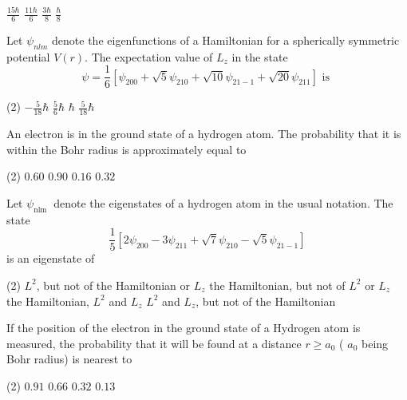 \begin{enumerate}
\begin{tasks}
	\task[\textbf{A.}] $\frac{15 \hbar}{6}$
	\task[\textbf{B.}]$\frac{11 \hbar}{6}$
	\task[\textbf{C.}]$\frac{3 \hbar}{8}$
	\task[\textbf{D.}]$\frac{\hbar}{8}$
\end{tasks}
\begin{minipage}{\textwidth}
	\item Let $\psi_{n l m}$ denote the eigenfunctions of a Hamiltonian for a spherically symmetric potential $V(r)$. The expectation value of $L_{z}$ in the state
	$$\psi=\frac{1}{6}\left[\psi_{200}+\sqrt{5} \psi_{210}+\sqrt{10} \psi_{21-1}+\sqrt{20} \psi_{211}\right] \text { is }$$
\end{minipage}
\begin{tasks}(2)
	\task[\textbf{A.}] $-\frac{5}{18} \hbar$
	\task[\textbf{B.}]$\frac{5}{6} \hbar$
	\task[\textbf{C.}]$\hbar$
	\task[\textbf{D.}] $\frac{5}{18} \hbar$
\end{tasks}
\begin{minipage}{\textwidth}
	\item An electron is in the ground state of a hydrogen atom. The probability that it is within the Bohr radius is approximately equal to
\end{minipage}
\begin{tasks}(2)
	\task[\textbf{A.}] $0.60$
	\task[\textbf{B.}] $0.90$
	\task[\textbf{C.}]$0.16$
	\task[\textbf{D.}]$0.32$
\end{tasks}
\begin{minipage}{\textwidth}
	\item Let $\psi_{\text {nlm }}$ denote the eigenstates of a hydrogen atom in the usual notation. The state
	$$
	\frac{1}{5}\left[2 \psi_{200}-3 \psi_{211}+\sqrt{7} \psi_{210}-\sqrt{5} \psi_{21-1}\right]
	$$
	is an eigenstate of
\end{minipage}
\begin{tasks}(2)
	\task[\textbf{A.}] $L^{2}$, but not of the Hamiltonian or $L_{z}$
	\task[\textbf{B.}]the Hamiltonian, but not of $L^{2}$ or $L_{z}$
	\task[\textbf{C.}]the Hamiltonian, $L^{2}$ and $L_{z}$
	\task[\textbf{D.}]$L^{2}$ and $L_{z}$, but not of the Hamiltonian
\end{tasks}
\begin{minipage}{\textwidth}
	\item If the position of the electron in the ground state of a Hydrogen atom is measured, the probability that it will be found at a distance $r \geq a_{0}$ ( $a_{0}$ being Bohr radius) is nearest to
\end{minipage}
\begin{tasks}(2)
	\task[\textbf{A.}] $0.91$ 
	\task[\textbf{B.}] $0.66$
	\task[\textbf{C.}] $0.32$
	\task[\textbf{D.}]$0.13$
\end{tasks}
\end{enumerate}

